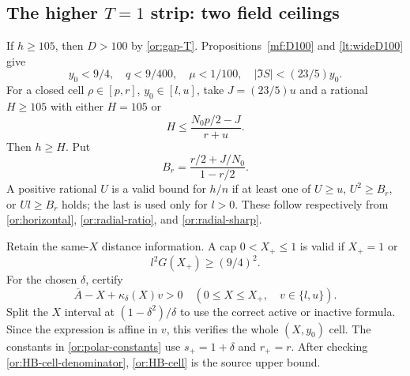 \subsection{The higher $T=1$ strip: two field ceilings}

If $h\ge105$, then $D>100$ by \eqref{or:gap-T}.
Propositions~\ref{mf:D100} and \ref{lt:wideD100} give
\begin{equation}\label{or:T-first-phase}
         y_0<9/4,\quad q<9/400,\quad \mu<1/100,\quad
                         |\Im S|<(23/5)y_0.
\end{equation}
For a closed cell $\rho\in[p,r]$, $y_0\in[l,u]$, take
$J=(23/5)u$ and a rational $H\ge105$ with either $H=105$ or
\begin{equation}\label{or:T-field-H}
                  H\le\frac{N_0p/2-J}{r+u}.
\end{equation}
Then $h\ge H$.  Put
\begin{equation}\label{or:T-radial-cell}
             B_r=\frac{r/2+J/N_0}{1-r/2}.
\end{equation}
A positive rational $U$ is a valid bound for $h/n$ if at least one
of $U\ge u$, $U^2\ge B_r$, or $Ul\ge B_r$ holds; the last is
used only for $l>0$.  These follow respectively from
\eqref{or:horizontal}, \eqref{or:radial-ratio}, and
\eqref{or:radial-sharp}.

Retain the same-$X$ distance information.  A cap $0<X_+\le1$ is
valid if $X_+=1$ or
\begin{equation}\label{or:T-Xcap}
                         l^2G(X_+)\ge(9/4)^2.
\end{equation}
For the chosen $\delta$, certify
\begin{equation}\label{or:T-Abar}
 \overline A-X+\kappa_\delta(X)v>0
       \quad(0\le X\le X_+,\quad v\in\{l,u\}).
\end{equation}
Split the $X$ interval at $(1-\delta^2)/\delta$ to use the correct
active or inactive formula.  Since the expression is affine in
$v$, this verifies the whole $(X,y_0)$ cell.  The constants in
\eqref{or:polar-constants} use $s_+=1+\delta$ and $r_+=r$.
After checking \eqref{or:HB-cell-denominator},
\eqref{or:HB-cell} is the source upper bound.

